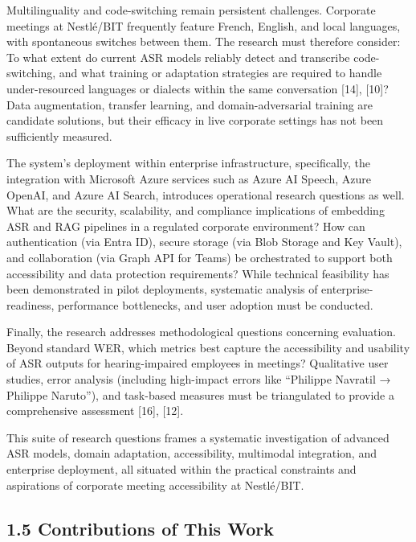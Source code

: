 \documentclass[12pt,a4paper]{article}
\begin{document}
Multilinguality and code-switching remain persistent challenges. Corporate meetings at Nestlé/BIT frequently feature French, English, and local languages, with spontaneous switches between them. The research must therefore consider: To what extent do current ASR models reliably detect and transcribe code-switching, and what training or adaptation strategies are required to handle under-resourced languages or dialects within the same conversation [14], [10]? Data augmentation, transfer learning, and domain-adversarial training are candidate solutions, but their efficacy in live corporate settings has not been sufficiently measured.


The system’s deployment within enterprise infrastructure, specifically, the integration with Microsoft Azure services such as Azure AI Speech, Azure OpenAI, and Azure AI Search, introduces operational research questions as well. What are the security, scalability, and compliance implications of embedding ASR and RAG pipelines in a regulated corporate environment? How can authentication (via Entra ID), secure storage (via Blob Storage and Key Vault), and collaboration (via Graph API for Teams) be orchestrated to support both accessibility and data protection requirements? While technical feasibility has been demonstrated in pilot deployments, systematic analysis of enterprise-readiness, performance bottlenecks, and user adoption must be conducted.


Finally, the research addresses methodological questions concerning evaluation. Beyond standard WER, which metrics best capture the accessibility and usability of ASR outputs for hearing-impaired employees in meetings? Qualitative user studies, error analysis (including high-impact errors like “Philippe Navratil → Philippe Naruto”), and task-based measures must be triangulated to provide a comprehensive assessment [16], [12].


This suite of research questions frames a systematic investigation of advanced ASR models, domain adaptation, accessibility, multimodal integration, and enterprise deployment, all situated within the practical constraints and aspirations of corporate meeting accessibility at Nestlé/BIT.


\subsection{1.5 Contributions of This Work}
\end{document}
